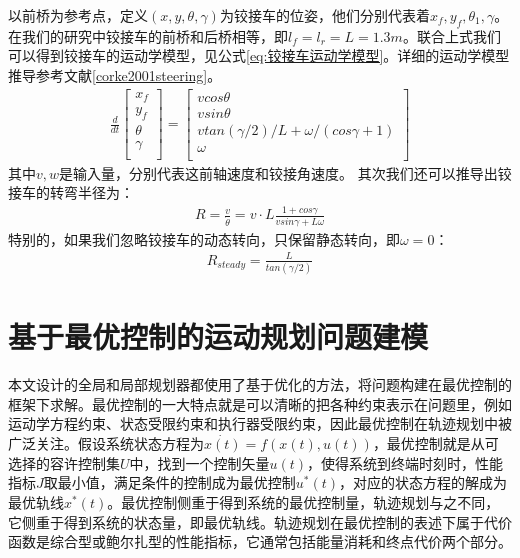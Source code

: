 \documentclass[master,academic]{ysuthesis} %
\begin{document}
	以前桥为参考点，定义$(x,y,\theta,\gamma)$为铰接车的位姿，他们分别代表着$x_f,y_f,\theta_1,\gamma$。在我们的研究中铰接车的前桥和后桥相等，即$l_f=l_r=L=1.3m$。联合上式我们可以得到铰接车的运动学模型，见公式\ref{eq:铰接车运动学模型}。详细的运动学模型推导参考文献\ref{corke2001steering}。
	\begin{equation}
		\begin{aligned}
			\frac{d}{dt}\left[ \begin{array}{c}
				x_f\\
				y_f\\
				\theta\\
				\gamma\\
			\end{array} \right] =\left[ \begin{array}{c}
				vcos\theta\\
				vsin\theta\\
				vtan( \gamma /2 ) /L+\omega /( cos\gamma +1 )\\
				\omega\\
			\end{array} \right] 
		\end{aligned}
		\label{eq:铰接车运动学模型}
	\end{equation}
	其中$v,w$是输入量，分别代表这前轴速度和铰接角速度。
	其次我们还可以推导出铰接车的转弯半径为：
	\begin{equation}
		\begin{aligned}
			R = \frac{v}{\dot{\theta}} = v\cdot L \frac{1+cos\gamma}{vsin\gamma+L\omega }
		\end{aligned}
	\end{equation}
	特别的，如果我们忽略铰接车的动态转向，只保留静态转向，即$\omega=0$：
	\begin{equation}
		\begin{aligned}
			R_{steady} = \frac{L}{tan(\gamma/2)} 
		\end{aligned}
	\end{equation}

		
		
	\section{基于最优控制的运动规划问题建模}
	本文设计的全局和局部规划器都使用了基于优化的方法，将问题构建在最优控制的框架下求解。最优控制的一大特点就是可以清晰的把各种约束表示在问题里，例如运动学方程约束、状态受限约束和执行器受限约束，因此最优控制在轨迹规划中被广泛关注。假设系统状态方程为$\dot{x(t)}=f(x(t),u(t))$，最优控制就是从可选择的容许控制集$U$中，找到一个控制矢量$u(t)$，使得系统到终端时刻时，性能指标$J$取最小值，满足条件的控制成为最优控制$u^{*}(t)$，对应的状态方程的解成为最优轨线$x^{*}(t)$。最优控制侧重于得到系统的最优控制量，轨迹规划与之不同，它侧重于得到系统的状态量，即最优轨线。轨迹规划在最优控制的表述下属于代价函数是综合型或鲍尔扎型的性能指标，它通常包括能量消耗和终点代价两个部分\cite{anderson2010optimal}。
	
\end{document}
